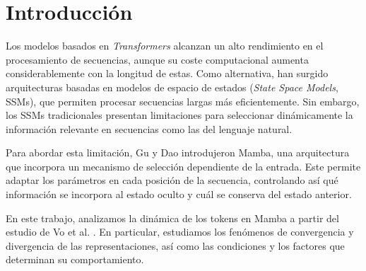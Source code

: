 \section{Introducción}
\label{sec:intro}

Los modelos basados en \textit{Transformers} alcanzan un alto rendimiento en el procesamiento de secuencias, 
aunque su coste computacional aumenta considerablemente con la longitud de estas. Como alternativa, han 
surgido arquitecturas basadas en modelos de espacio de estados (\textit{State Space Models}, SSMs), que 
permiten procesar secuencias largas más eficientemente. Sin embargo, los SSMs tradicionales presentan 
limitaciones para seleccionar dinámicamente la información relevante en secuencias como las del lenguaje natural.

Para abordar esta limitación, Gu y Dao \cite{gu2023mamba} introdujeron Mamba, una arquitectura que incorpora 
un mecanismo de selección dependiente de la entrada. Este permite adaptar los parámetros en cada posición de 
la secuencia, controlando así qué información se incorpora al estado oculto y cuál se conserva del estado 
anterior.

En este trabajo, analizamos la dinámica de los tokens en Mamba a partir del estudio de Vo et al. \cite{vo2025token}. 
En particular, estudiamos los fenómenos de convergencia y divergencia de las representaciones, 
así como las condiciones y los factores que determinan su comportamiento.